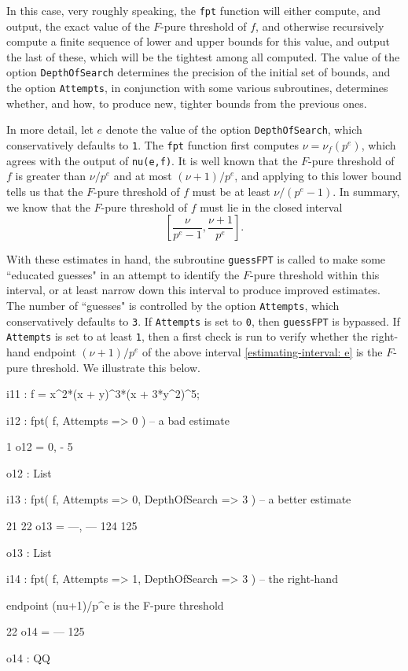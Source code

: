 \documentclass{amsart}
\begin{document}
In this case, very roughly speaking, the {\tt fpt} function will either compute, and output, the exact value of the $F$-pure threshold of $f$, and otherwise recursively compute a finite sequence of lower and upper bounds for this value, and output the last of these, which will be the tightest among all computed.  The value of the option {\tt DepthOfSearch} determines the precision of the initial set of bounds, and the option {\tt Attempts}, in conjunction with some various subroutines, determines whether, and how, to produce new, tighter bounds from the previous ones.

In more detail, let $e$ denote the value of the option {\tt DepthOfSearch}, which conservatively defaults to {\tt 1}.  The {\tt fpt} function first computes $\nu=\nu_f(p^e)$, which agrees with the output of {\tt nu(e,f)}.  It is well known that the $F$-pure threshold of $f$ is greater than $\nu/p^e$ and at most $(\nu+1)/p^e$, and applying  \cite[Proposition 4.2]{HernandezFPurityOfHypersurfaces} to this lower bound tells us that the $F$-pure threshold of $f$ must be at least $\nu/(p^e-1)$.  In summary, we know that the $F$-pure threshold of $f$ must lie in the closed interval 
%
\begin{equation}
\label{estimating-interval: e}
\tag{$\dagger$}
\left[ \frac{\nu}{p^e-1}, \frac{\nu+1}{p^e} \right].
\end{equation}

With these estimates in hand, the subroutine {\tt guessFPT} is called to make some ``educated guesses" in an attempt to identify the $F$-pure threshold within this interval, or at least narrow down this interval to produce improved estimates.  The number of ``guesses" is controlled by the option {\tt Attempts}, which conservatively defaults to {\tt 3}.  If {\tt Attempts} is set to {\tt 0}, then {\tt guessFPT} is bypassed. If  {\tt Attempts} is set to at least {\tt 1}, then a first check is run to verify whether the right-hand endpoint $(\nu+1)/p^e$ of the above interval \eqref{estimating-interval: e} is the $F$-pure threshold.  We illustrate this below.
 
{\small
{}
\begin{MyVerbatim}

i11 : f = x^2*(x + y)^3*(x + 3*y^2)^5;

i12 : fpt( f, Attempts => 0 ) -- a bad estimate

          1
o12 = {0, -}
          5

o12 : List

i13 : fpt( f, Attempts => 0, DepthOfSearch => 3 ) -- a better estimate

        21   22
o13 = {---, ---}
       124  125

o13 : List

i14 : fpt( f, Attempts => 1, DepthOfSearch => 3 ) -- the right-hand 

      endpoint (nu+1)/p^e is the F-pure threshold

       22
o14 = ---
      125

o14 : QQ

\end{MyVerbatim}
} 
\end{document}
